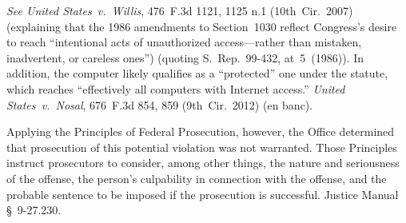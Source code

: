 \textit{See United States~v.\ Willis}, 476~F.3d 1121, 1125 n.1 (10th~Cir.~2007) (explaining that the 1986 amendments to Section~1030 reflect Congress's desire to reach ``intentional acts of unauthorized access---rather than mistaken, inadvertent, or careless ones'') (quoting S.~Rep.~99-432, at~5~(1986)).
In addition, the computer  likely qualifies as a ``protected'' one under the statute, which reaches ``effectively all computers with Internet access.''
\textit{United States~v.\ Nosal}, 676~F.3d 854, 859 (9th~Cir.~2012) (en banc).

Applying the Principles of Federal Prosecution, however, the Office determined that prosecution of this potential violation was not warranted.
Those Principles instruct prosecutors to consider, among other things, the nature and seriousness of the offense, the person's culpability in connection with the offense, and the probable sentence to be imposed if the prosecution is successful.
Justice Manual \S~9-27.230. 

